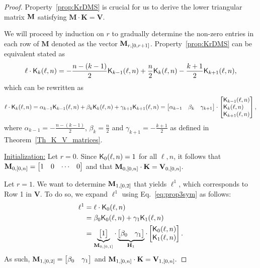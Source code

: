 \documentclass[11pt]{llncs}
\begin{document}
\begin{proof}
	Property~\ref{prop:KrDMS} is crucial for us to derive the lower triangular matrix $\mathbf{M}$ satisfying $\mathbf{M} \cdot \mathbf{K} = \mathbf{V}$.

	We will proceed by induction on $r$ to gradually determine the non-zero entries
	in each row of $\mathbf{M}$ denoted as the vector $\mathbf{M}_{r,[0,r+1]}$.
	Property~\ref{prop:KrDMS} can be equivalent stated as
	\begin{equation*}
	\ell\cdot\mathsf{K}_{k}(\ell,n) = -\frac{n - (k - 1)}{2}\mathsf{K}_{k-1}(\ell,n) + \frac{n}{2}\mathsf{K}_{k}(\ell,n)  -\frac{k+1}{2}\mathsf{K}_{k+1}(\ell,n) ,
	\end{equation*}
	which can be rewritten as
	\begin{equation}\label{eq:prop3sym}
	\ell\cdot\kraw{k}{\ell}{n} = \alpha_{k-1}\kraw{k-1}{\ell}{n} + \beta_k\kraw{k}{\ell}{n} + \gamma_{k+1}\kraw{k+1}{\ell}{n}= \begin{bmatrix}
	\alpha_{k-1} & \beta_k & \gamma_{k+1}
	\end{bmatrix} \cdot \begin{bmatrix*}[l]
	\kraw{k-1}{\ell}{n} \\ \kraw{k}{\ell}{n} \\ \kraw{k+1}{\ell}{n}
	\end{bmatrix*},
	\end{equation}
	where  $\alpha_{k-1} = -\frac{n - (k - 1)}{2}$, $\beta_k = \frac{n}{2}$ and $\gamma_{k+1} = -\frac{k+1}{2}$ as defined in Theorem~\ref{Th_K_V_matrices}.

	\underline{Initialization:} Let $r = 0$. Since $\mathsf{K}_{0}(\ell,n) = 1$ for all $\ell, n$, it follows
	that $\mathbf{M}_{0,[0,n]} = \begin{bmatrix}1 & 0 & \cdots & 0\end{bmatrix}$ and that $\mathbf{M}_{0,[0,n]}\cdot \mathbf{K} = \mathbf{V}_{0,[0,n]}.$

	Let $r = 1$. We want to determine $\mathbf{M}_{1,[0,2]}$ that yields $\ell^1$, which corresponds to Row 1 in $\mathbf{V}$.
	To do so, we expand $\ell^1$ using Eq.~\eqref{eq:prop3sym} as follows:
	\begin{equation*}
	\begin{split}
	\ell^1 &= \ell \cdot \mathsf{K}_{0}(\ell,n)\\
	&= \beta_0 \mathsf{K}_{0}(\ell,n) + \gamma_1 \mathsf{K}_{1}(\ell,n) \\
	&= \underbrace{\begin{bmatrix}1\end{bmatrix}}_{\mathbf{M}_{0,[0,1]}} \cdot \underbrace{\begin{bmatrix}\beta_0 & \gamma_1\end{bmatrix}}_{\mathbf{H}_1} \cdot \begin{bmatrix}\mathsf{K}_{0}(\ell,n)\\\mathsf{K}_{1}(\ell,n)\end{bmatrix}.
	\end{split}
	\end{equation*}
	As such, $\mathbf{M}_{1,[0,2]} = \begin{bmatrix}\beta_0 & \gamma_1\end{bmatrix}$ and $\mathbf{M}_{1,[0,n]}\cdot \mathbf{K} = \mathbf{V}_{1,[0,n]}.$


\end{proof}
\end{document}
